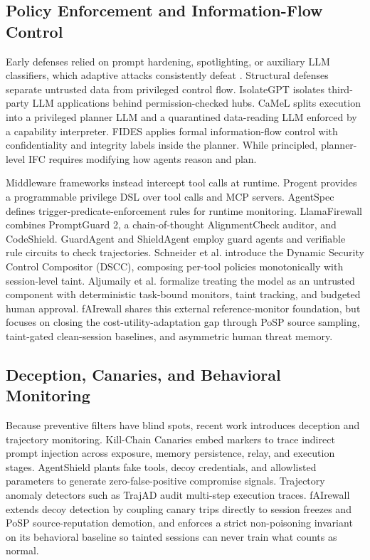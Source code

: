 \documentclass[conference]{IEEEtran}
\begin{document}
\subsection{Policy Enforcement and Information-Flow Control}
Early defenses relied on prompt hardening, spotlighting, or auxiliary LLM classifiers, which adaptive attacks consistently defeat \cite{zhan2025adaptive, abdelnabi2025llmail}. Structural defenses separate untrusted data from privileged control flow. IsolateGPT \cite{wu2024isolategpt} isolates third-party LLM applications behind permission-checked hubs. CaMeL \cite{debenedetti2025camel} splits execution into a privileged planner LLM and a quarantined data-reading LLM enforced by a capability interpreter. FIDES \cite{costa2025fides} applies formal information-flow control with confidentiality and integrity labels inside the planner. While principled, planner-level IFC requires modifying how agents reason and plan.

Middleware frameworks instead intercept tool calls at runtime. Progent \cite{shi2025progent} provides a programmable privilege DSL over tool calls and MCP servers. AgentSpec \cite{wang2025agentspec} defines trigger-predicate-enforcement rules for runtime monitoring. LlamaFirewall \cite{chennabasappa2025llamafirewall} combines PromptGuard 2, a chain-of-thought AlignmentCheck auditor, and CodeShield. GuardAgent \cite{xiang2024guardagent} and ShieldAgent \cite{chen2025shieldagent} employ guard agents and verifiable rule circuits to check trajectories. Schneider et al. \cite{schneider2026dscc} introduce the Dynamic Security Control Compositor (DSCC), composing per-tool policies monotonically with session-level taint. Aljumaily et al. \cite{aljumaily2026untrusted} formalize treating the model as an untrusted component with deterministic task-bound monitors, taint tracking, and budgeted human approval. fAIrewall shares this external reference-monitor foundation, but focuses on closing the cost-utility-adaptation gap through PoSP source sampling, taint-gated clean-session baselines, and asymmetric human threat memory.

\subsection{Deception, Canaries, and Behavioral Monitoring}
Because preventive filters have blind spots, recent work introduces deception and trajectory monitoring. Kill-Chain Canaries \cite{wang2026killchain} embed markers to trace indirect prompt injection across exposure, memory persistence, relay, and execution stages. AgentShield \cite{rassul2026agentshield} plants fake tools, decoy credentials, and allowlisted parameters to generate zero-false-positive compromise signals. Trajectory anomaly detectors such as TrajAD \cite{trajad2026} audit multi-step execution traces. fAIrewall extends decoy detection by coupling canary trips directly to session freezes and PoSP source-reputation demotion, and enforces a strict non-poisoning invariant on its behavioral baseline so tainted sessions can never train what counts as normal.
\end{document}
